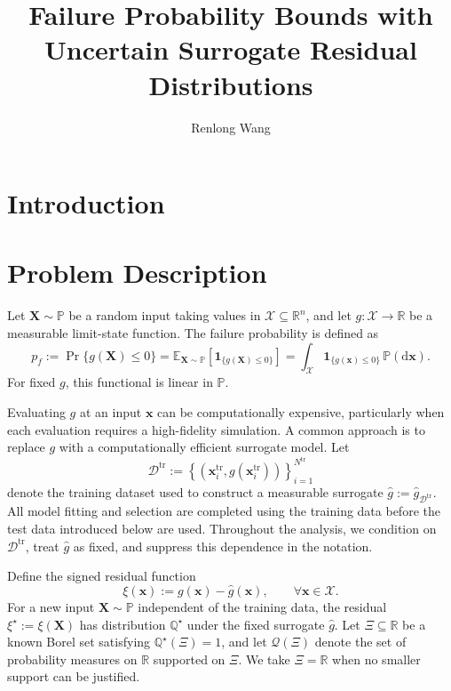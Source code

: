 \documentclass[review,11pt,3p,authoryear,nopreprintline]{elsarticle}
\begin{document}
\begin{frontmatter}
  \title{Failure Probability Bounds with Uncertain Surrogate Residual Distributions}

  \author[inst1]{Renlong Wang}

  \begin{abstract}
  \end{abstract}

  \begin{keyword}
  \end{keyword}
\end{frontmatter}

\section{Introduction}

\section{Problem Description}
\label{sec-problem}

Let $\bm X\sim\mathbb P$ be a random input taking values in $\mathcal X\subseteq\mathbb R^n$, and let $g:\mathcal X\to\mathbb R$ be a measurable limit-state function. The failure probability is defined as
\[
  p_f:=\Pr\{g(\bm X)\le0\}=\mathbb E_{\bm X\sim\mathbb P}\left[\mathbf 1_{\{g(\bm X)\le0\}}\right]=\int_{\mathcal X}\mathbf 1_{\{g(\bm x)\le0\}}\,\mathbb P(\mathrm d\bm x).
\]
For fixed $g$, this functional is linear in $\mathbb P$.

Evaluating $g$ at an input $\bm x$ can be computationally expensive, particularly when each evaluation requires a high-fidelity simulation. A common approach is to replace $g$ with a computationally efficient surrogate model. Let
\[
  \mathcal D^{\mathrm{tr}}:=\left\{\left(\bm x_i^{\mathrm{tr}},g(\bm x_i^{\mathrm{tr}})\right)\right\}_{i=1}^{N^{\mathrm{tr}}}
\]
denote the training dataset used to construct a measurable surrogate $\hat g:=\hat g_{\mathcal D^{\mathrm{tr}}}$. All model fitting and selection are completed using the training data before the test data introduced below are used. Throughout the analysis, we condition on $\mathcal D^{\mathrm{tr}}$, treat $\hat g$ as fixed, and suppress this dependence in the notation.

Define the signed residual function
\[
  \xi(\bm x):=g(\bm x)-\hat g(\bm x),\qquad \forall \bm x\in\mathcal X.
\]
For a new input $\bm X\sim\mathbb P$ independent of the training data, the residual $\xi^\star:=\xi(\bm X)$ has distribution $\mathbb Q^\star$ under the fixed surrogate $\hat g$. Let $\Xi\subseteq\mathbb R$ be a known Borel set satisfying $\mathbb Q^\star(\Xi)=1$, and let $\mathcal Q(\Xi)$ denote the set of probability measures on $\mathbb R$ supported on $\Xi$. We take $\Xi=\mathbb R$ when no smaller support can be justified.
\end{document}
